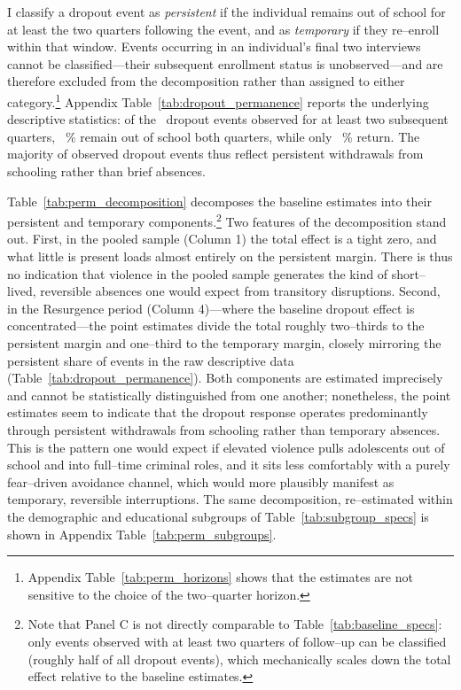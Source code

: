 \documentclass[12pt,letter,english,intoc,bibliography=totoc,index=totoc,BCOR10mm,captions=tableheading,nottitlepage,fleqn]{article}
\theoremstyle{break}
\begin{document}
I classify a dropout event as \textit{persistent} if the individual remains out of school for at least the two quarters following the event, and as \textit{temporary} if they re--enroll within that window. Events occurring in an individual's final two interviews cannot be classified---their subsequent enrollment status is unobserved---and are therefore excluded from the decomposition rather than assigned to either category.\footnote{Appendix Table~\ref{tab:perm_horizons} shows that the estimates are not sensitive to the choice of the two--quarter horizon.} Appendix Table~\ref{tab:dropout_permanence} reports the underlying descriptive statistics: of the \NEventsTwoQ\ dropout events observed for at least two subsequent quarters, \StillOutTwoQ\ \% remain out of school both quarters, while only \RetTwoQ\ \% return. The majority of observed dropout events thus reflect persistent withdrawals from schooling rather than brief absences.

Table~\ref{tab:perm_decomposition} decomposes the baseline estimates into their persistent and temporary components.\footnote{Note that Panel C is not directly comparable to Table~\ref{tab:baseline_specs}: only events observed with at least two quarters of follow--up can be classified (roughly half of all dropout events), which mechanically scales down the total effect relative to the baseline estimates.} Two features of the decomposition stand out. First, in the pooled sample (Column 1) the total effect is a tight zero, and what little is present loads almost entirely on the persistent margin. There is thus no indication that violence in the pooled sample generates the kind of short--lived, reversible absences one would expect from transitory disruptions. Second, in the Resurgence period (Column 4)---where the baseline dropout effect is concentrated---the point estimates divide the total roughly two--thirds to the persistent margin and one--third to the temporary margin, closely mirroring the persistent share of events in the raw descriptive data (Table~\ref{tab:dropout_permanence}). Both components are estimated imprecisely and cannot be statistically distinguished from one another; nonetheless, the point estimates seem to indicate that the dropout response operates predominantly through persistent withdrawals from schooling rather than temporary absences. This is the pattern one would expect if elevated violence pulls adolescents out of school and into full--time criminal roles, and it sits less comfortably with a purely fear--driven avoidance channel, which would more plausibly manifest as temporary, reversible interruptions. The same decomposition, re--estimated within the demographic and educational subgroups of Table~\ref{tab:subgroup_specs} is shown in Appendix Table~\ref{tab:perm_subgroups}.
\end{document}
